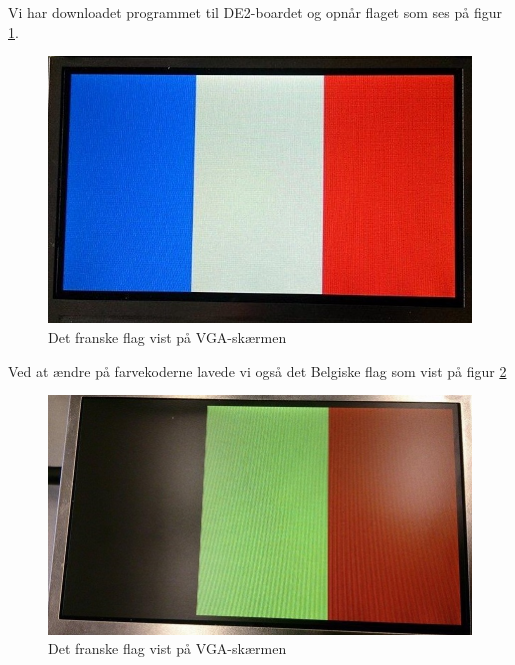 \begin{enumerate}
Vi har downloadet programmet til DE2-boardet og opnår flaget som ses på figur \ref{fig:frenchFlag}.
	\begin{figure}[H]
		\centering
		\includegraphics[scale=0.5]{pictures/Oevelse8/opg2/franskFlag}
		\caption{Det franske flag vist på VGA-skærmen}
		\label{fig:frenchFlag}
	\end{figure}
Ved at ændre på farvekoderne lavede vi også det Belgiske flag som vist på figur \ref{fig:belgiskflag}
\begin{figure}[H]
	\centering
	\includegraphics[scale=0.4]{pictures/Oevelse8/opg2/belgiskFlag}
	\caption{Det franske flag vist på VGA-skærmen}
	\label{fig:belgiskflag}
\end{figure}
\end{enumerate}